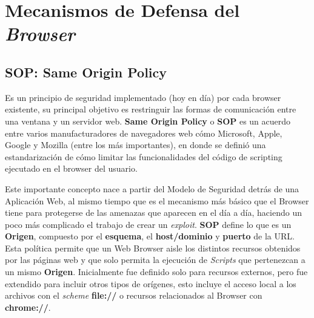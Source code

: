




\section{Mecanismos de Defensa del \textit{Browser}}

\subsection{SOP: Same Origin Policy} %
\label{chap2:SOP}

    Es un principio de seguridad implementado (hoy en día) por cada browser existente, su principal objetivo es restringuir las formas de comunicación entre una ventana y un servidor web. \textbf{Same Origin Policy} o \textbf{SOP} es un acuerdo entre varios manufacturadores de navegadores web cómo Microsoft, Apple, Google y Mozilla (entre los más importantes), en donde se definió una estandarización de cómo limitar las funcionalidades del código de scripting ejecutado en el browser del usuario. 

    Este importante concepto nace a partir del Modelo de Seguridad detrás de una Aplicación Web, al mismo tiempo que es el mecanismo más básico que el Browser tiene para protegerse de las amenazas que aparecen en el día a día, haciendo un poco más complicado el trabajo de crear un \textit{exploit}. \textbf{SOP} define lo que es un \textbf{Origen}, compuesto por el \textbf{esquema}, el \textbf{host/dominio} y \textbf{puerto} de la URL. Esta política permite que un Web Browser aisle los distintos recursos obtenidos por las páginas web y que solo permita la ejecución de \textit{Scripts} que pertenezcan a un mismo \textbf{Origen}. Inicialmente fue definido solo para recursos externos, pero fue extendido para incluir otros tipos de orígenes, esto incluye el acceso local a los archivos con el \textit{scheme} \textbf{file://} o recursos relacionados al Browser con \textbf{chrome://}.


